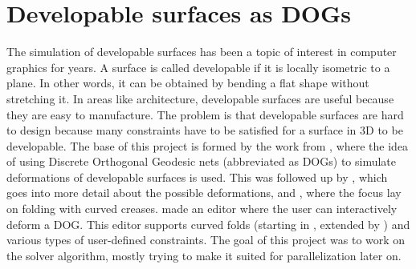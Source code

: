 \documentclass[a4paper,twoside,12pt,nochapterprefix]{scrbook}
\begin{document}
\section{Developable surfaces as DOGs}
The simulation of developable surfaces has been a topic of interest in computer graphics for years. A surface is called developable if it is locally isometric to a plane. In other words, it can be obtained by bending a flat shape without stretching it. In areas like architecture, developable surfaces are useful because they are easy to manufacture. The problem is that developable surfaces are hard to design because many constraints have to be satisfied for a surface in 3D to be developable.\newline
The base of this project is formed by the work from \cite{Rabinovich:DogNets:2018}, where the idea of using Discrete Orthogonal Geodesic nets (abbreviated as DOGs) to simulate deformations of developable surfaces is used. This was followed up by \cite{Rabinovich:DogShapeSpace:2018}, which goes into more detail about the possible deformations, and \cite{Rabinovich:CurvedFolds:2019}, where the focus lay on folding with curved creases.\newline
\cite{Rabinovich:DogNets:2018} made an editor where the user can interactively deform a DOG. This editor supports curved folds (starting in \cite{Rabinovich:DogShapeSpace:2018}, extended by \cite{Rabinovich:CurvedFolds:2019}) and various types of user-defined constraints. The goal of this project was to work on the solver algorithm, mostly trying to make it suited for parallelization later on.\newline
\end{document}
